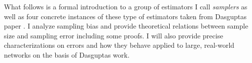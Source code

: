What follows is a formal introduction to a group of estimators I call \textit{samplers} as well as four concrete instances of these type of estimators taken from Dasguptas paper \cite{dasgupta2012social}. I analyze sampling bias and provide theoretical relations between sample size and sampling error including some proofs.
I will also provide precise characterizations on errors and how they behave applied to large, real-world networks on the basis of Dasguptas work.
